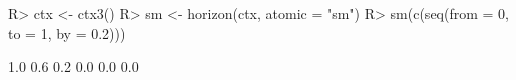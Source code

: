 \begin{Schunk}
% --begin: "horizon"
\begin{Sinput}
R> ctx <- ctx3()
R> sm <- horizon(ctx, atomic = "sm")
R> sm(c(seq(from = 0, to = 1, by = 0.2)))
\end{Sinput}
\begin{Soutput}
[1] 1.0 0.6 0.2 0.0 0.0 0.0
\end{Soutput}
%
% --end: "horizon"
\end{Schunk}
